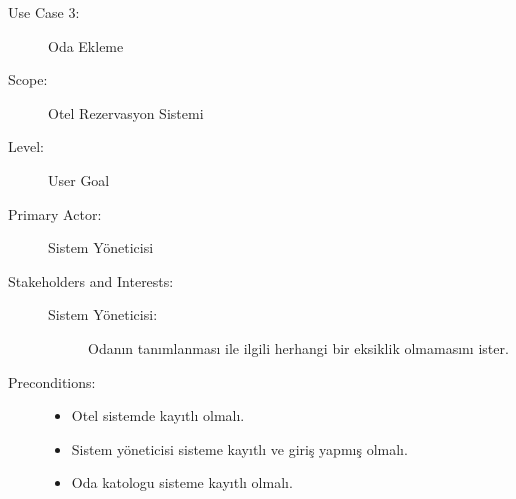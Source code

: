\documentclass[12pt,a4paper]{report}
\begin{document}
\newpage
\begin{description}
\item[Use Case 3:] Oda Ekleme \\
\item[Scope:] Otel Rezervasyon Sistemi
\item[Level:] User Goal
\item[Primary Actor:] Sistem Yöneticisi 
\item[Stakeholders and Interests:] \hspace{10 mm}
\begin{description} 
\item[Sistem Yöneticisi:] Odanın tanımlanması ile ilgili herhangi bir eksiklik olmamasını ister.
\end{description}
\item[Preconditions:] \hspace{10mm}
\begin{itemize}
\item Otel sistemde kayıtlı olmalı.
\item Sistem yöneticisi sisteme kayıtlı ve giriş yapmış olmalı.
\item Oda katologu sisteme kayıtlı olmalı.
\end{itemize}


\end{description}
\end{document}
